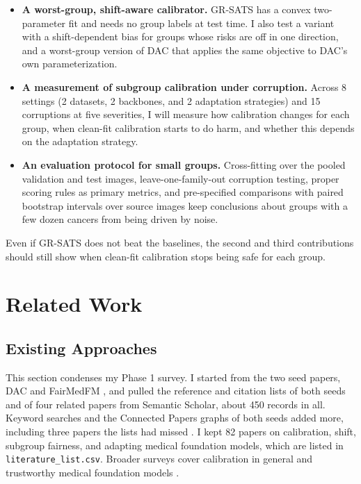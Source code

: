 \documentclass[sigconf,nonacm]{acmart}
\begin{document}
\begin{itemize}
  \item \textbf{A worst-group, shift-aware calibrator.} GR-SATS has a convex two-parameter fit and needs no group labels at test time. I also test a variant with a shift-dependent bias for groups whose risks are off in one direction, and a worst-group version of DAC that applies the same objective to DAC's own parameterization.
  \item \textbf{A measurement of subgroup calibration under corruption.} Across 8 settings (2 datasets, 2 backbones, and 2 adaptation strategies) and 15 corruptions at five severities, I will measure how calibration changes for each group, when clean-fit calibration starts to do harm, and whether this depends on the adaptation strategy.
  \item \textbf{An evaluation protocol for small groups.} Cross-fitting over the pooled validation and test images, leave-one-family-out corruption testing, proper scoring rules as primary metrics, and pre-specified comparisons with paired bootstrap intervals over source images keep conclusions about groups with a few dozen cancers from being driven by noise.
\end{itemize}

Even if GR-SATS does not beat the baselines, the second and third contributions should still show when clean-fit calibration stops being safe for each group.

\section{Related Work}
\label{sec:related}

\subsection{Existing Approaches}

This section condenses my Phase 1 survey. I started from the two seed papers, DAC \cite{tomani2023dac} and FairMedFM \cite{jin2024fairmedfm}, and pulled the reference and citation lists of both seeds and of four related papers \cite{tomani2021posthoc,roschewitz2025where,disalvo2024medmnistc,salvador2022faircal} from Semantic Scholar, about 450 records in all. Keyword searches and the Connected Papers graphs of both seeds added more, including three papers the lists had missed \cite{hekler2023tta,yang2023beyond,tian2024fairdomain}. I kept 82 papers on calibration, shift, subgroup fairness, and adapting medical foundation models, which are listed in \texttt{literature\_list.csv}. Broader surveys cover calibration in general \cite{wang2023survey} and trustworthy medical foundation models \cite{shi2024survey}.
\end{document}
